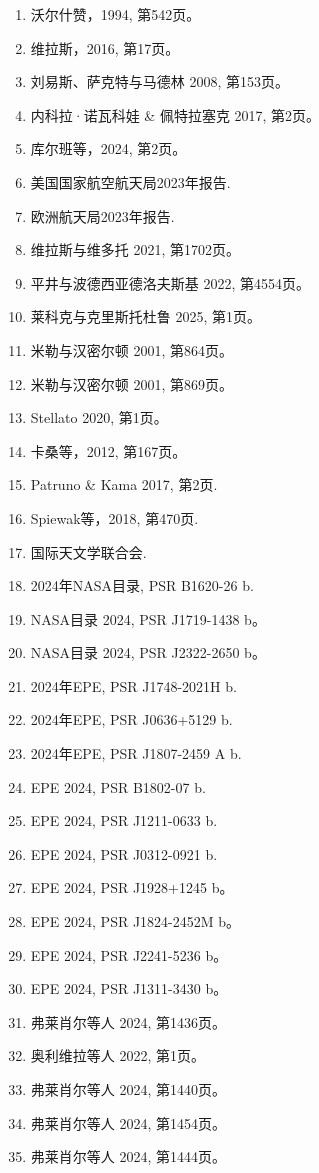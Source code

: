 \begin{enumerate}
\item 沃尔什赞，1994, 第542页。
\item 维拉斯，2016, 第17页。
\item 刘易斯、萨克特与马德林 2008, 第153页。
\item 内科拉·诺瓦科娃 & 佩特拉塞克 2017, 第2页。
\item 库尔班等，2024, 第2页。
\item 美国国家航空航天局2023年报告.
\item 欧洲航天局2023年报告.
\item 维拉斯与维多托 2021, 第1702页。
\item 平井与波德西亚德洛夫斯基 2022, 第4554页。
\item 莱科克与克里斯托杜鲁 2025, 第1页。
\item 米勒与汉密尔顿 2001, 第864页。
\item 米勒与汉密尔顿 2001, 第869页。
\item Stellato 2020, 第1页。
\item 卡桑等，2012, 第167页。
\item Patruno & Kama 2017, 第2页.
\item Spiewak等，2018, 第470页.
\item 国际天文学联合会.
\item 2024年NASA目录, PSR B1620-26 b.
\item NASA目录 2024, PSR J1719-1438 b。
\item NASA目录 2024, PSR J2322-2650 b。
\item 2024年EPE, PSR J1748-2021H b.
\item 2024年EPE, PSR J0636+5129 b.
\item 2024年EPE, PSR J1807-2459 A b.
\item EPE 2024, PSR B1802-07 b.
\item EPE 2024, PSR J1211-0633 b.
\item EPE 2024, PSR J0312-0921 b.
\item EPE 2024, PSR J1928+1245 b。
\item EPE 2024, PSR J1824-2452M b。
\item EPE 2024, PSR J2241-5236 b。
\item EPE 2024, PSR J1311-3430 b。
\item 弗莱肖尔等人 2024, 第1436页。
\item 奥利维拉等人 2022, 第1页。
\item 弗莱肖尔等人 2024, 第1440页。
\item 弗莱肖尔等人 2024, 第1454页。
\item 弗莱肖尔等人 2024, 第1444页。

\end{enumerate}
